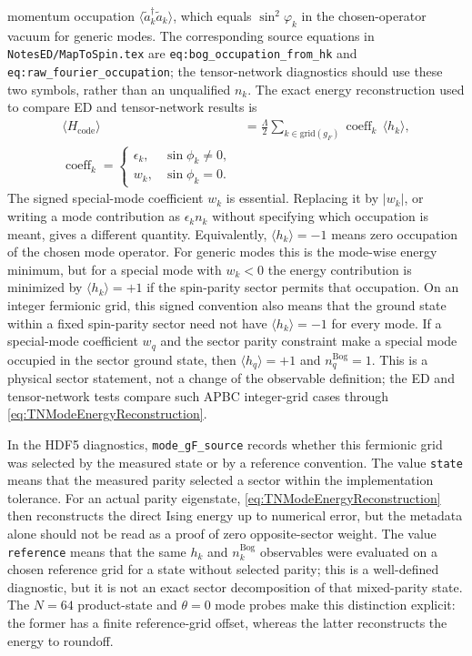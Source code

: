 \documentclass[aps,pra,twocolumn,superscriptaddress,nolongbibliography,nobalancelastpage,10pt]{revtex4-2}
\begin{document}
momentum occupation $\langle\tilde a_k^\dagger\tilde a_k\rangle$, which equals
$\sin^2\varphi_k$ in the chosen-operator vacuum for generic modes.  The
corresponding source equations in \texttt{NotesED/MapToSpin.tex} are
\texttt{eq:bog\_occupation\_from\_hk} and
\texttt{eq:raw\_fourier\_occupation}; the tensor-network diagnostics should
use these two symbols, rather than an unqualified \(n_k\).  The exact energy
reconstruction used to compare ED and tensor-network results is
\begin{align}
	\langle H_{\mathrm{code}}\rangle
	&=\frac{\Lambda}{2}\sum_{k\in\mathrm{grid}(g_F)}
	\operatorname{coeff}_k\,\langle h_k\rangle ,
	\label{eq:TNModeEnergyReconstruction}\\
	\operatorname{coeff}_k=
	\begin{cases}
		\epsilon_k, & \sin\phi_k\neq 0,\\
		w_k, & \sin\phi_k=0.
	\end{cases}
\end{align}
The signed special-mode coefficient $w_k$ is essential.  Replacing it by
$|w_k|$, or writing a mode contribution as $\epsilon_k n_k$ without specifying
which occupation is meant, gives a different quantity.
Equivalently, $\langle h_k\rangle=-1$ means zero occupation of the chosen mode
operator.  For generic modes this is the mode-wise energy minimum, but for a
special mode with $w_k<0$ the energy contribution is minimized by
$\langle h_k\rangle=+1$ if the spin-parity sector permits that occupation.
On an integer fermionic grid, this signed convention also means that the
ground state within a fixed spin-parity sector need not have
$\langle h_k\rangle=-1$ for every mode.  If a special-mode coefficient $w_q$
and the sector parity constraint make a special mode occupied in the sector
ground state, then $\langle h_q\rangle=+1$ and
$n_q^{\mathrm{Bog}}=1$.  This is a physical sector statement, not a change of
the observable definition; the ED and tensor-network tests compare such APBC
integer-grid cases through \cref{eq:TNModeEnergyReconstruction}.

In the HDF5 diagnostics, \texttt{mode\_gF\_source} records whether this
fermionic grid was selected by the measured state or by a reference convention.
The value \texttt{state} means that the measured parity selected a sector
within the implementation tolerance.  For an actual parity eigenstate,
\cref{eq:TNModeEnergyReconstruction} then reconstructs the direct Ising energy
up to numerical error, but the metadata alone should not be read as a proof of
zero opposite-sector weight.  The value \texttt{reference} means that the same
\(h_k\) and \(n_k^{\mathrm{Bog}}\) observables were evaluated on a chosen
reference grid for a state without selected parity; this is a well-defined
diagnostic, but it is not an exact sector decomposition of that mixed-parity
state.  The \(N=64\) product-state and \(\theta=0\) mode probes make this
distinction explicit: the former has a finite reference-grid offset, whereas
the latter reconstructs the energy to roundoff.
\end{document}
